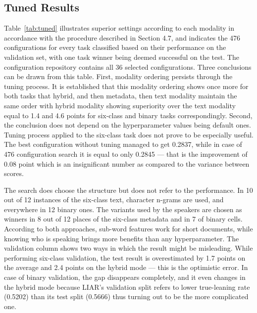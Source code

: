 \subsection{Tuned Results}

Table~\ref{tab:tuned} illustrates superior settings according to each modality in accordance with the procedure described in Section 4.7, and indicates the 476 configurations for every task classified based on their performance on the validation set, with one task winner being deemed successful on the test. The configuration repository contains all 36 selected configurations. Three conclusions can be drawn from this table. First, modality ordering persists through the tuning process. It is established that this modality ordering shows once more for both tasks that hybrid, and then metadata, then text modality maintain the same order with hybrid modality showing superiority over the text modality equal to 1.4 and 4.6 points for six-class and binary tasks correspondingly. Second, the conclusion does not depend on the hyperparameter values being default ones. Tuning process applied to the six-class task does not prove to be especially useful. The best configuration without tuning managed to get 0.2837, while in case of 476 configuration search it is equal to only 0.2845 --- that is the improvement of 0.08 point which is an insignificant number as compared to the variance between scores.



The search does choose the structure but does not refer to the performance. In 10 out of 12 instances of the six-class text, character n-grams are used, and everywhere in 12 binary ones. The variants used by the speakers are chosen as winners in 8 out of 12 places of the six-class metadata and in 7 of binary cells. According to both approaches, sub-word features work for short documents, while knowing who is speaking brings more benefits than any hyperparameter. The validation column shows two ways in which the result might be misleading. While performing six-class validation, the test result is overestimated by 1.7 points on the average and 2.4 points on the hybrid mode --- this is the optimistic error. In case of binary validation, the gap disappears completely, and it even changes in the hybrid mode because LIAR's validation split refers to lower true-leaning rate (0.5202) than its test split (0.5666) thus turning out to be the more complicated one.


